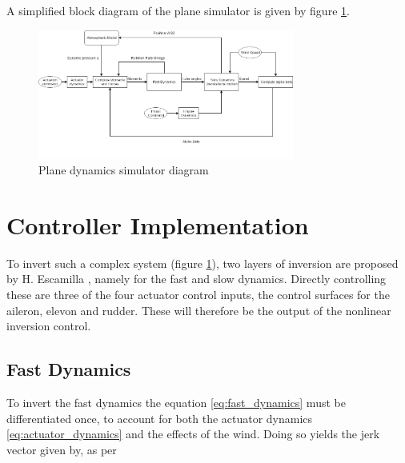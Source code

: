 A simplified block diagram of the plane simulator is given by figure \ref{fig:plane_model}.
\begin{figure}[!htb]
  \centering
  \includegraphics[width=0.75\textwidth]{Figures/PlaneModel.png}
  \caption[Plane dynamics simulator diagram]{Plane dynamics simulator diagram}
  \label{fig:plane_model}
\end{figure}
 

\section{Controller Implementation}
\label{section:control_implement}

To invert such a complex system (figure \ref{fig:plane_model}), two layers of inversion are proposed by H. Escamilla \cite{hector}, namely for the fast and slow dynamics. Directly controlling these are three of the four actuator control inputs, the control surfaces for the aileron, elevon and rudder. These will therefore be the output of the nonlinear inversion control. 

\subsection{Fast Dynamics}
To invert the fast dynamics the equation \ref{eq:fast_dynamics} must be differentiated once, to account for both the actuator dynamics \ref{eq:actuator_dynamics} and the effects of the wind. Doing so yields the jerk vector given by, as per \cite{hector}

